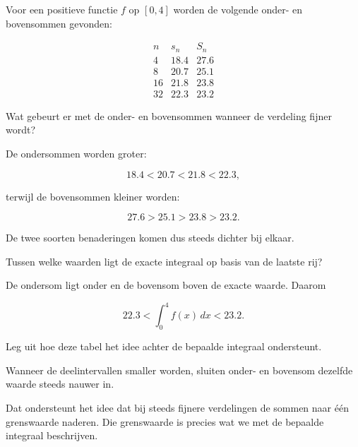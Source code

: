 \documentclass{ximera}
\begin{document}
\begin{oefening}{\oefU\ESS}

Voor een positieve functie \(f\) op \([0,4]\) worden de volgende
onder- en bovensommen gevonden:

\[
\begin{array}{c|c|c}
n & s_n & S_n\\
\hline
4  & 18.4 & 27.6\\
8  & 20.7 & 25.1\\
16 & 21.8 & 23.8\\
32 & 22.3 & 23.2
\end{array}
\]

\begin{question}
Wat gebeurt er met de onder- en bovensommen wanneer de verdeling fijner
wordt?

\begin{oplossing}
De ondersommen worden groter:

\[
18.4<20.7<21.8<22.3,
\]

terwijl de bovensommen kleiner worden:

\[
27.6>25.1>23.8>23.2.
\]

De twee soorten benaderingen komen dus steeds dichter bij elkaar.
\end{oplossing}
\end{question}

\begin{question}
Tussen welke waarden ligt de exacte integraal op basis van de laatste
rij?

\begin{oplossing}
De ondersom ligt onder en de bovensom boven de exacte waarde. Daarom

\[
\boxed{
22.3
<
\int_0^4f(x)\,dx
<
23.2
}.
\]
\end{oplossing}
\end{question}

\begin{question}
Leg uit hoe deze tabel het idee achter de bepaalde integraal ondersteunt.

\begin{oplossing}
Wanneer de deelintervallen smaller worden, sluiten onder- en bovensom
dezelfde waarde steeds nauwer in.

Dat ondersteunt het idee dat bij steeds fijnere verdelingen de sommen
naar één grenswaarde naderen. Die grenswaarde is precies wat we met de
bepaalde integraal beschrijven.
\end{oplossing}
\end{question}

\end{oefening}
\end{document}

